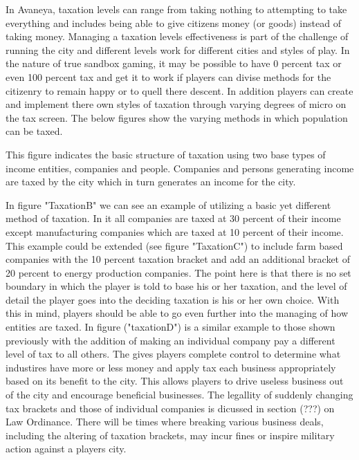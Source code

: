 In Avaneya, taxation levels can range from taking nothing to attempting to take everything and includes being able to give citizens money (or goods) instead of taking money. Managing a taxation levels effectiveness is part of the challenge of running the city and different levels work for different cities and styles of play. In the nature of true sandbox gaming, it may be possible to have 0 percent tax or even 100 percent tax and get it to work if players can divise methods for the citizenry to remain happy or to quell there descent. In addition players can create and implement there own styles of taxation through varying degrees of micro on the tax screen. The below figures show the varying methods in which population can be taxed.

This figure indicates the basic structure of taxation using two base types of income entities, companies and people. Companies and persons generating income are taxed by the city which in turn generates an income for the city.  

In figure "TaxationB" we can see an example of utilizing a basic yet different method of taxation. In it all companies are taxed at 30 percent of their income except manufacturing companies which are taxed at 10 percent of their income. This example could be extended (see figure "TaxationC") to include farm based companies with the 10 percent taxation bracket and add an additional bracket of 20 percent to energy production companies. The point here is that there is no set boundary in which the player is told to base his or her taxation, and the level of detail the player goes into the deciding taxation is his or her own choice. With this in mind, players should be able to go even further into the managing of how entities are taxed. 
In figure ("taxationD") is a similar example to those shown previously with the addition of making an individual company pay a different level of tax to all others. The gives players complete control to determine what industires have more or less money and apply tax each business appropriately based on its benefit to the city. This allows players to drive useless business out of the city and encourage beneficial businesses. The legallity of suddenly changing tax brackets and those of individual companies is dicussed in section (???) on Law Ordinance. There will be times where breaking various business deals, including the altering of taxation brackets, may incur fines or inspire military action against a players city.

